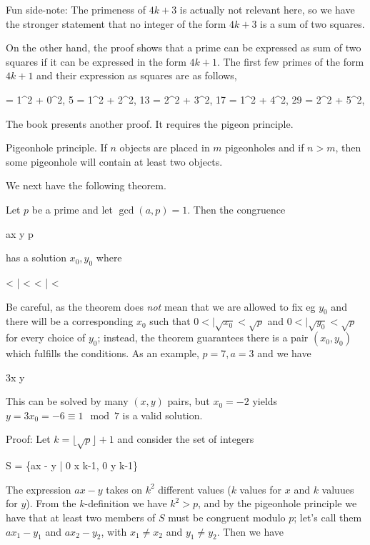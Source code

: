 Fun side-note: The primeness of $4k+3$ is actually not relevant here, so we have the stronger statement that no integer of the form $4k+3$ is a sum of two squares.

On the other hand, the proof shows that a prime can be expressed as sum of two squares if it can be expressed in the form $4k+1$. The first few primes of the form $4k+1$ and their expression as squares are as follows,

 = 1^2 + 0^2, 5 = 1^2 + 2^2, 13 = 2^2 + 3^2, 17 = 1^2 + 4^2, 29 = 2^2 + 5^2, \cdots
\eee

The book presents another proof. It requires the pigeon principle.

\begin{theorem}
    Pigeonhole principle. If $n$ objects are placed in $m$ pigeonholes and if $n > m$, then some pigeonhole will contain at least two objects.
\end{theorem}

We next have the following theorem.

\begin{theorem}\label{2023_04_24:th2}
    Let $p$ be a prime and let $\gcd(a,p)=1$. Then the congruence

    \bee
    ax \equiv y \mod p
    \eee

    has a solution $x_0, y_0$ where

     < |  <  \quad {}  < |  < 
    \eee

\end{theorem}

Be careful, as the theorem does \emph{not} mean that we are allowed to fix eg $y_0$ and there will be a corresponding $x_0$ such that $0 < | \sqrt{x_0} < \sqrt{p}$ and $0 < | \sqrt{y_0} < \sqrt{p}$ for every choice of $y_0$; instead, the theorem guarantees there is a pair $(x_0, y_0)$ which fulfills the conditions. As an example, $p=7, a=3$ and we have

\bee
3x \equiv y 
\eee

This can be solved by many $(x,y)$ pairs, but $x_0 = -2$ yields $y = 3 x_0 = -6 \equiv 1 \mod 7$ is a valid solution.

Proof: Let $k = \lfloor \sqrt{p} \rfloor + 1$ and consider the set of integers

\bee
S = \{ax - y | 0 \leq x \leq k-1, 0 \leq y \leq k-1\}
\eee

The expression $ax-y$ takes on $k^2$ different values ($k$ values for $x$ and $k$ valuues for $y$). From the $k$-definition we have $k^2 > p$, and by the pigeonhole principle we have that at least two members of $S$ must be congruent modulo $p$; let's call them $ax_1 - y_1$ and $ax_2 - y_2$, with $x_1 \neq x_2$ and $y_1 \neq y_2$. Then we have

